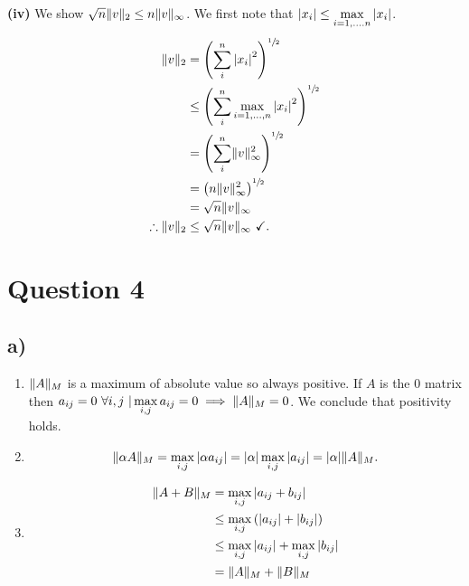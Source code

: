 \documentclass[12pt]{article}
\DeclarePairedDelimiter{\norm}{\lVert}{\rVert}
\theoremstyle{definition}
\theoremstyle{definition}
\theoremstyle{definition}
\theoremstyle{definition}
\theoremstyle{definition}
\theoremstyle{example}
\theoremstyle{note}
\theoremstyle{remark}
\theoremstyle{example}
\begin{document}
			\textbf{(iv)} We show $\sqrt{n} \norm{v}_{2} \le n \norm{v}_{\infty}$.
			We first note that $\abs{x_{i}} \le \max\limits_{i = 1 , \dots . n } \abs{x_{i}}$. 
			\begin{align*}
				\norm{v}_{2} &= \left(\sum_{i}^{n} \abs{x_{i}}^{2}\right)^{\sfrac{1}{2} }\\
				&\le \left(\sum_{i}^{n} \max\limits_{i = 1 , \dots , n} \abs{x_{i}}^{2}\right)^{\sfrac{1}{2}} \\
				&= \left(\sum_{i}^{n} \norm{v}_{\infty}^{2}\right)^{\sfrac{1}{2}} \\
				&= \left(n \norm{v}_{\infty}^{2}\right)^{\sfrac{1}{2}}\\
				&= \sqrt{n} \norm{v}_{\infty} \\
				\therefore \norm{v}_{2} & \le \sqrt{n} \norm{v}_{\infty} \ \checkmark.
			\end{align*}
		\section*{Question 4}
			\subsection*{a) }
				\begin{enumerate}[label = (\roman*)]
					\item  $\norm{A}_{M}$ is a maximum of absolute value so always positive. If $A$ is the $0$ matrix then $a_{ij} =0 \ \forall i,j \ |  \max\limits_{i,j} a_{ij} = 0 \implies \norm{A}_{M} =0$. We conclude that positivity holds. 
					\item \begin{equation*}
					\norm{\alpha A}_{M}  = \max\limits_{i,j} \abs{\alpha a_{ij}} = \abs{\alpha} \max\limits_{i,j} \abs{a_{ij}} = \abs{\alpha} \norm{A}_{M}.
					\end{equation*}
					\item \begin{align*}
					\norm{A+B}_{M} &= \max\limits_{i,j} \abs{a_{ij} + b_{ij}} \\
					&\le \max\limits_{i,j} \left(\abs{a_{ij}} + \abs{b_{ij}}\right) \\
					&\le \max\limits_{i,j} \abs{a_{ij}} + \max\limits_{i,j} \abs{b_{ij}} \\
					&= \norm{A}_{M} + \norm{B}_{M} 
					\end{align*}
				\end{enumerate}
\end{document}
